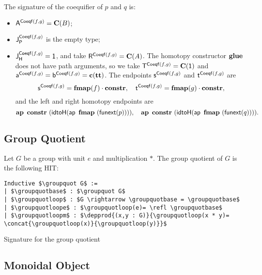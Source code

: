 The signature of the coequifier of $p$ and $q$ is:
\begin{itemize}
\item $\pointconstr[\coequifier f g] = \constantP{B}$;
\item $\pathlabel[\coequifier f g]$ is the empty type; 
\item $\homotlabel[\coequifier f g] = \unit$, and take 
  $\homotpointarg[\coequifier f g] = \constantP{A}$.
  The homotopy constructor $\coequifierglue$ does not have path arguments, so we take  
  $\homotpathtarg[\coequifier f g] = \constantP{\unit}$ and
  $\pathargleft[\coequifier f g] = \pathargright[\coequifier f g] = \Ce(\unitt)$.
  The endpoints $\homotpathleft[\coequifier f g]$ and $\homotpathright[\coequifier f g]$ are
  \[
  \homotpathleft[\coequifier f g] = \comp{\fmap(f)}{\constr}, \quad
  \homotpathright[\coequifier f g] = \comp{\fmap(g)}{\constr},
  \]
  and the left and right homotopy endpoints are
  \[
  \hap{\constr}{(\idtoH(\ap{\fmap}{(\funextsec(p))}))}, \quad
  \hap{\constr}{(\idtoH(\ap{\fmap}{(\funextsec(q))}))}.
  \]
\end{itemize}


\subsection{Group Quotient}
\label{sec:group_quotient}

Let $G$ be a group with unit $e$ and multiplication $*$. The group
quotient of $G$ is the following HIT:
\begin{lstlisting}[mathescape=true]
Inductive $\groupquot G$ :=
| $\groupquotbase$ : $\groupquot G$
| $\groupquotloop$ : $G \rightarrow \groupquotbase = \groupquotbase$
| $\groupquotloope$ : $\groupquotloop(e)= \refl \groupquotbase$
| $\groupquotloopm$ : $\depprod{(x,y : G)}{\groupquotloop(x * y)= \concat{\groupquotloop(x)}{\groupquotloop(y)}}$
\end{lstlisting}


Signature for the group quotient

\subsection{Monoidal Object}
\label{sec:monoidal_object}

